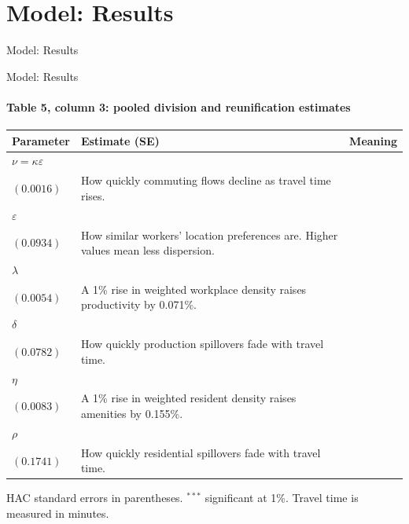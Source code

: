 \documentclass[aspectratio=169,11pt]{beamer}
\newcommand{\decksection}[1]{%
  \section{#1}
  \begin{frame}[plain]
    \vfill{\usebeamerfont{title}\color{navy}\LARGE #1}\vfill
  \end{frame}}
\begin{document}
\decksection{Model: Results}
\begin{frame}{Model: Results}
\framesubtitle{Table 5, column 3: pooled division and reunification estimates}
  \small
  \renewcommand{\arraystretch}{1.35}
  \begin{tabular}{@{}p{1.5cm}p{1.9cm}p{10.2cm}@{}}
    \toprule
    Parameter & Estimate (SE) & Meaning \\
    \midrule
    $\nu=\kappa\varepsilon$ & \shortstack{$0.0987^{***}$\\$(0.0016)$} & How quickly commuting flows decline as travel time rises. \\[0.5em]
    $\varepsilon$ & \shortstack{$6.6941^{***}$\\$(0.0934)$} & How similar workers' location preferences are. Higher values mean less dispersion. \\[0.5em]
    $\lambda$ & \shortstack{$0.0710^{***}$\\$(0.0054)$} & A 1\% rise in weighted workplace density raises productivity by 0.071\%. \\[0.5em]
    $\delta$ & \shortstack{$0.3617^{***}$\\$(0.0782)$} & How quickly production spillovers fade with travel time. \\[0.5em]
    $\eta$ & \shortstack{$0.1553^{***}$\\$(0.0083)$} & A 1\% rise in weighted resident density raises amenities by 0.155\%. \\[0.5em]
    $\rho$ & \shortstack{$0.7595^{***}$\\$(0.1741)$} & How quickly residential spillovers fade with travel time. \\
    \bottomrule
  \end{tabular}
  \par\vspace{0.4em}\scriptsize HAC standard errors in parentheses.
  $^{***}$ significant at 1\%. Travel time is measured in minutes.
\end{frame}
\end{document}
